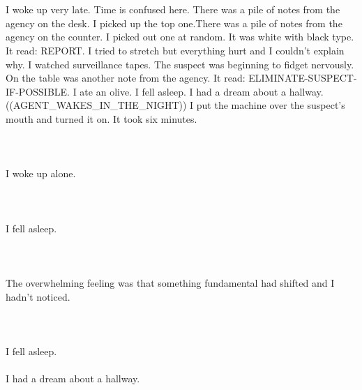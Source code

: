 \documentclass{article}
\begin{document}
    \section{}
    I woke up very late. Time is confused here. There was a pile of notes from the agency on the desk. I picked up the top one.There was a pile of notes from the agency on the counter. I picked out one at random. It was white with black type. It read: REPORT. I tried to stretch but everything hurt and I couldn't explain why. I watched surveillance tapes. The suspect was beginning to fidget nervously. On the table was another note from the agency. It read: ELIMINATE-SUSPECT-IF-POSSIBLE. I ate an olive. I fell asleep. I had a dream about a hallway. ((AGENT_WAKES_IN_THE_NIGHT)) I put the machine over the suspect's mouth and turned it on. It took six minutes. \\\\
    \newpage
    
    \section{}
    I woke up alone.\\\\ 
    \newpage
    
    \section{}
    I fell asleep.\\\\ 
    \newpage
    
    \section{}
    The overwhelming feeling was that something fundamental had shifted and I hadn't noticed.\\\\ 
    \newpage
    
    \section{}
    I fell asleep.\\\\I had a dream about a hallway.\\\\ 
    \newpage
    
    
\end{document}
